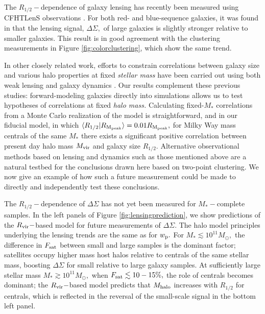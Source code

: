 \documentclass[usenatbib,usegraphicx,letterpaper]{mn2e}
\newcommand{\rhalf}{R_{1/2}}
\newcommand{\mstar}{M_{\ast}}
\newcommand{\mvir}{M_{\rm vir}}
\newcommand{\mhalo}{M_{\rm halo}}
\newcommand{\rvir}{R_{\rm vir}}
\newcommand{\rmpeak}{R_{\rm M_{peak}}}
\newcommand{\wproj}{w_{\rm p}}
\newcommand{\mean}[2]{\langle{#1}\vert{#2}\rangle}
\newcommand{\msun}{M_\odot}
\begin{document}
The $\rhalf-$dependence of galaxy lensing has recently been measured using CFHTLenS observations \citep{heymans_etal12,erben_etal13}. For both red- and blue-sequence galaxies, it was found in \citet{charlton_etal17} that the lensing signal, $\Delta\Sigma,$ of large galaxies is slightly stronger relative to smaller galaxies. This result is in good agreement with the clustering measurements in Figure \ref{fig:colorclustering}, which show the same trend. 

In other closely related work, efforts to constrain correlations between galaxy size and various halo properties at fixed {\em stellar mass} have been carried out using both weak lensing \citep[e.g.,][]{sonnenfeld_leauthaud18} and galaxy dynamics \citep[e.g.,][]{desmond_wechsler15,desmond_wechsler17}. Our results complement these previous studies: forward-modeling galaxies directly into simulations allows us to test hypotheses of correlations at fixed {\em halo mass.} Calculating fixed-$\mstar$ correlations from a Monte Carlo realization of the model is straightforward, and in our fiducial model, in which $\mean{\rhalf}{\rmpeak}=0.01\rmpeak,$ for Milky Way mass centrals of the same $\mstar$ there exists a significant positive correlation between present day halo mass $\mvir$ and galaxy size $\rhalf.$ Alternative observational methods based on lensing and dynamics such as those mentioned above are a natural testbed for the conclusions drawn here based on two-point clustering. We now give an example of how such a future measurement could be made to directly and independently test these conclusions. 

The $\rhalf-$dependence of $\Delta\Sigma$ has not yet been measured for $\mstar-$complete samples. In the left panels of Figure \ref{fig:lensingprediction}, we show predictions of the $\rvir-$based model for future measurements of $\Delta\Sigma.$ The halo model principles underlying the lensing trends are the same as for $\wproj.$ For $\mstar\lesssim10^{11}\msun,$ the difference in $F_{\rm sat}$ between small and large samples is the dominant factor; satellites occupy higher mass host halos relative to centrals of the same stellar mass, boosting $\Delta\Sigma$ for small relative to large galaxy samples. At sufficiently large stellar mass $\mstar\gtrsim10^{11}\msun,$ when $F_{\rm sat}\lesssim10-15\%,$ the role of centrals becomes dominant; the $\rvir-$based model predicts that $\mhalo$ increases with $\rhalf$ for centrals, which is reflected in the reversal of the small-scale signal in the bottom left panel. 
\end{document}
